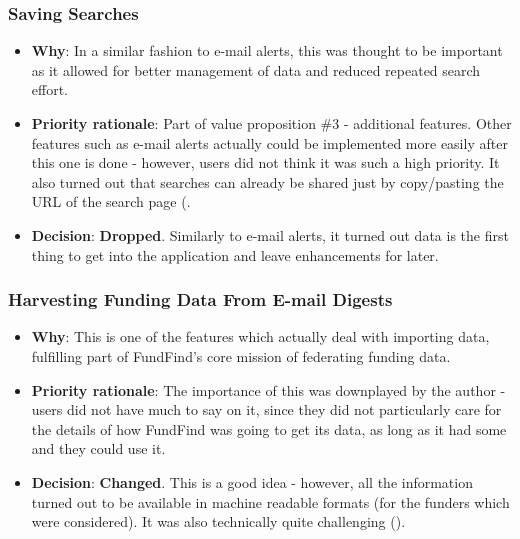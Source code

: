 \subsubsection{Saving Searches}
\label{reqs-saving-searches}
\begin{itemize}
 \item \textbf{Why}: In a similar fashion to e-mail alerts, this was thought to be important as it allowed for better management of data and reduced repeated search effort.
 \item \textbf{Priority rationale}: Part of value proposition \#3 - additional features. Other features such as e-mail alerts actually could be implemented more easily after this one is done - however, users did not think it was such a high priority. It also turned out that searches can already be shared just by copy/pasting the URL of the search page (.
 \item \textbf{Decision}: \textbf{Dropped}. Similarly to e-mail alerts, it turned out data is the first thing to get into the application and leave enhancements for later.
\end{itemize}

\subsubsection{Harvesting Funding Data From E-mail Digests}
\begin{itemize}
 \item \textbf{Why}: This is one of the features which actually deal with importing data, fulfilling part of FundFind's core mission of federating funding data.
 \item \textbf{Priority rationale}: The importance of this was downplayed by the author - users did not have much to say on it, since they did not particularly care for the details of how FundFind was going to get its data, as long as it had some and they could use it.
 \item \textbf{Decision}: \textbf{Changed}. This is a good idea - however, all the information turned out to be available in machine readable formats (for the funders which were considered). It was also technically quite challenging ().
\end{itemize}

